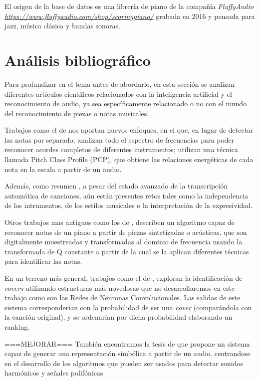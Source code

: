 \documentclass[12pt]{article}
\begin{document}
\bigskip
El origen de la base de datos es una librería de piano de la compañía \textit{FluffyAudio} \textit{\url{https://www.fluffyaudio.com/shop/scoringpiano/}} 
grabada en 2016 y pensada para jazz, música clásica y bandas sonoras.

\section{Análisis bibliográfico}
\label{Análisis bibliográfico}
Para profundizar en el tema antes de abordarlo, en esta sección se analizan diferentes artículos científicos relacionados con la inteligencia
artificial y el reconocimiento de audio, ya sea específicamente relacionado o no con el mundo del reconocimiento de piezas o notas musicales.

\bigskip
Trabajos como el de \cite{osmalsky2012neural} nos aportan nuevos enfoques, 
en el que, en lugar de detectar las notas por separado, analizan todo el espectro de frecuencias para poder reconocer acordes completos de diferentes instrumentos;
utilizan una técnica llamada Pitch Class Profile (PCP), que obtiene las relaciones energéticas de cada nota en la escala a partir de un audio.

\bigskip
Además, como resumen \cite{benetos2018automatic},
a pesar del estado avanzado de la transcripción automática de canciones, aún están presentes retos tales como la independencia de los intrumentos, de los estilos
musicales o la interpretación de la expresividad.

\bigskip
Otros trabajos mas antiguos como los de \cite{foo1999recognition}, describen un algoritmo capaz de reconocer notas
de un piano a partir de piezas sintetizadas o acústicas, que son digitalmente muestreadas y transformadas al dominio de frecuencia usando 
la transformada de Q constante a partir de la cual se la aplican diferentes técnicas para identificar las notas.

\bigskip
En un terreno más general, trabajos como el de \cite{chang2017audio}, exploran la identificación de \textit{covers} utilizando
estructuras más novedosas que no desarrollaremos en este trabajo como son las Redes de Neuronas Convolucionales. Las salidas de este
sistema corresponderían con la probabilidad de ser una \textit{cover} (comparándola con la canción original), y se ordenarían por dicha 
probabilidad elaborando un ranking.

\bigskip
===MEJORAR===
También encontramos la tesis de \cite{klapuri2004signal} que propone un sistema capaz de generar una representación 
simbólica a partir de un audio. centrandose en el desarrollo de los algoritmos que pueden ser usados para detectar sonidos harmónicos y señales polifónicas
\end{document}
